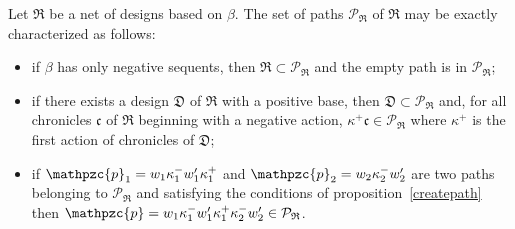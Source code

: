 \documentclass{LMCS}
\newcommand{\chronicle}[1]{{\mathfrak{#1}}}
\newcommand{\design}[1]{{\mathfrak{#1}}}
\newcommand{\pathLL}[1]{\mathpzc{#1}}\newcommand{\strategy}[1]{\pathLL{#1}}\newcommand{\view}[1]{\raisebox{.3ex}{$\ulcorner$}{#1}\raisebox{.3ex}{$\urcorner$}}\newcommand{\fullview}[1]{\raisebox{.3ex}{$\ulcorner\mkern-6mu\ulcorner\mkern-2mu$}{#1}\raisebox{.3ex}{$\mkern-2mu\urcorner\mkern-6mu\urcorner$}}\newcommand{\views}[1]{\view{#1}}\newcommand{\fullviews}[1]{\fullview{#1}}\newcommand{\shuffle}[1]{\llcorner\design{#1}\lrcorner}\newcommand{\PoD}[1]{{\mathcal{P}}_{#1}}\newcommand{\norm}[1]{\llbracket\design{#1}\rrbracket}
\begin{document}
\begin{prop}\label{prop:characSetOfPaths}
Let $\design{R}$ be a net of designs based on $\beta$.
The set of paths $\PoD{\design{R}}$ of $\design{R}$ may be exactly
characterized as follows:
\begin{itemize}[label=$-$]
\item if $\beta$ has only negative sequents, then $\design{R} \subset \PoD{\design{R}}$ and the empty path is in $\PoD{\design{R}}$;
\item if there exists a design $\design{D}$ of $\design{R}$ with a positive base, then $\design{D} \subset \PoD{\design{R}}$ and, for all chronicles $\chronicle{c}$ of $\design{R}$ beginning with a negative action, $\kappa^+\chronicle{c}\in\PoD{\design{R}}$ where $\kappa^+$ is the first action of chronicles of $\design{D}$;
\item if $\pathLL{p}_1=w_1\kappa_1^-w'_1\kappa^+_1$ and $\pathLL{p}_2=w_2\kappa_2^-w'_2$ are two paths belonging to $\PoD{\design{R}}$ and satisfying the conditions of proposition~\ref{createpath} then
$\pathLL{p}=w_1\kappa_1^-w'_1\kappa_1^+\kappa_2^-w'_2\in\PoD{\design{R}}$.
\end{itemize}
\end{prop}
\end{document}
